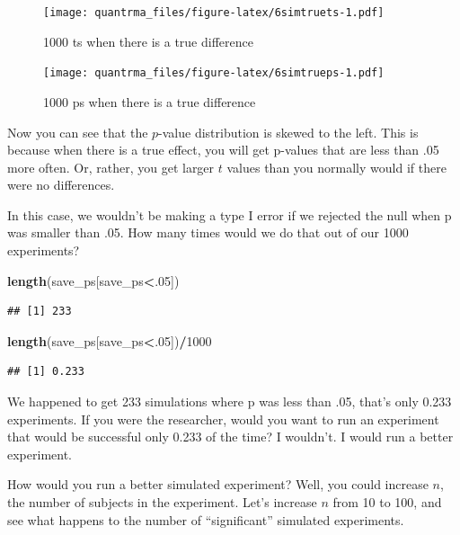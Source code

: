 \documentclass[
]{book}
\newenvironment{Shaded}{\begin{snugshade}}{\end{snugshade}}
\newcommand{\DecValTok}[1]{\textcolor[rgb]{0.00,0.00,0.81}{#1}}
\newcommand{\KeywordTok}[1]{\textcolor[rgb]{0.13,0.29,0.53}{\textbf{#1}}}
\newcommand{\NormalTok}[1]{#1}
\newcommand{\OperatorTok}[1]{\textcolor[rgb]{0.81,0.36,0.00}{\textbf{#1}}}
\begin{document}
\begin{figure}
\centering
\texttt{[image: quantrma\_files/figure-latex/6simtruets-1.pdf]}
\caption{\label{fig:6simtruets}1000 ts when there is a true difference}
\end{figure}

\begin{figure}
\centering
\texttt{[image: quantrma\_files/figure-latex/6simtrueps-1.pdf]}
\caption{\label{fig:6simtrueps}1000 ps when there is a true difference}
\end{figure}

Now you can see that the \(p\)-value distribution is skewed to the left. This is because when there is a true effect, you will get p-values that are less than .05 more often. Or, rather, you get larger \(t\) values than you normally would if there were no differences.

In this case, we wouldn't be making a type I error if we rejected the null when p was smaller than .05. How many times would we do that out of our 1000 experiments?

\begin{Shaded}
\begin{Highlighting}[]
\KeywordTok{length}\NormalTok{(save_ps[save_ps}\OperatorTok{<}\NormalTok{.}\DecValTok{05}\NormalTok{])}
\end{Highlighting}
\end{Shaded}

\begin{verbatim}
## [1] 233
\end{verbatim}

\begin{Shaded}
\begin{Highlighting}[]
\KeywordTok{length}\NormalTok{(save_ps[save_ps}\OperatorTok{<}\NormalTok{.}\DecValTok{05}\NormalTok{])}\OperatorTok{/}\DecValTok{1000}
\end{Highlighting}
\end{Shaded}

\begin{verbatim}
## [1] 0.233
\end{verbatim}

We happened to get 233 simulations where p was less than .05, that's only 0.233 experiments. If you were the researcher, would you want to run an experiment that would be successful only 0.233 of the time? I wouldn't. I would run a better experiment.

How would you run a better simulated experiment? Well, you could increase \(n\), the number of subjects in the experiment. Let's increase \(n\) from 10 to 100, and see what happens to the number of ``significant'' simulated experiments.
\end{document}
